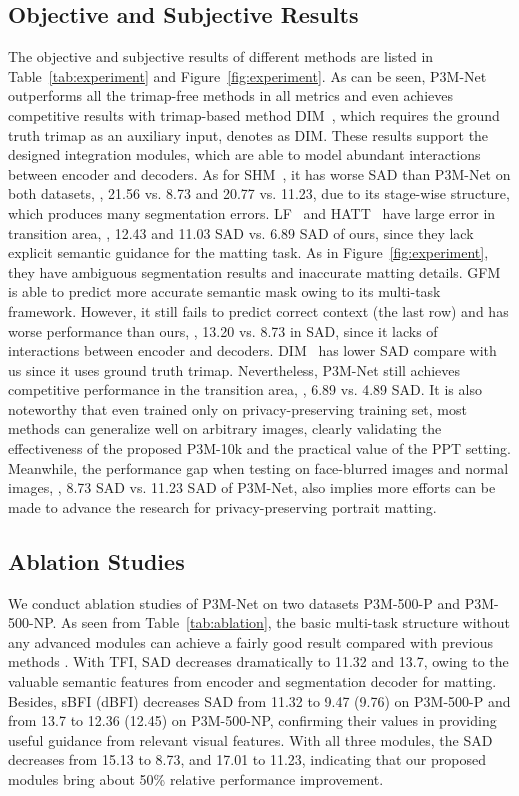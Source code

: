 \documentclass[sigconf]{acmart}
\begin{document}
\subsection{Objective and Subjective Results}
The objective and subjective results of different methods are listed in Table~\ref{tab:experiment} and Figure~\ref{fig:experiment}. As can be seen, P3M-Net outperforms all the trimap-free methods in all metrics and even achieves competitive results with trimap-based method DIM~\cite{dim}, which requires the ground truth trimap as an auxiliary input, denotes as DIM. These results support the designed integration modules, which are able to model abundant interactions between encoder and decoders. As for SHM~\cite{shm}, it has worse SAD than P3M-Net on both datasets, , 21.56 vs. 8.73 and 20.77 vs. 11.23, due to its stage-wise structure, which produces many segmentation errors. LF~\cite{lf} and HATT~\cite{hatt} have large error in transition area, , 12.43 and 11.03 SAD vs. 6.89 SAD of ours, since they lack explicit semantic guidance for the matting task. As in Figure~\ref{fig:experiment}, they have ambiguous segmentation results and inaccurate matting details. GFM~\cite{gfm} is able to predict more accurate semantic mask owing to its multi-task framework. However, it still fails to predict correct context (the last row) and has worse performance than ours, , 13.20 vs. 8.73 in SAD, since it lacks of interactions between encoder and decoders. DIM~\cite{dim} has lower SAD compare with us since it uses ground truth trimap. Nevertheless, P3M-Net still achieves competitive performance in the transition area, , 6.89 vs. 4.89 SAD. It is also noteworthy that even trained only on privacy-preserving training set, most methods can generalize well on arbitrary images, clearly validating the effectiveness of the proposed P3M-10k and the practical value of the PPT setting. Meanwhile, the performance gap when testing on face-blurred images and normal images, , 8.73 SAD vs. 11.23 SAD of P3M-Net, also implies more efforts can be made to advance the research for privacy-preserving portrait matting.

\subsection{Ablation Studies}
We conduct ablation studies of P3M-Net on two datasets P3M-500-P and P3M-500-NP. As seen from Table~\ref{tab:ablation}, the basic multi-task structure without any advanced modules can achieve a fairly good result compared with previous methods \cite{shm,hatt,lf}. With TFI, SAD decreases dramatically to 11.32 and 13.7, owing to the valuable semantic features from encoder and segmentation decoder for matting. Besides, sBFI (dBFI) decreases SAD from 11.32 to 9.47 (9.76) on P3M-500-P and from 13.7 to 12.36 (12.45) on P3M-500-NP, confirming their values in providing useful guidance from relevant visual features. With all three modules, the SAD decreases from 15.13 to 8.73, and 17.01 to 11.23, indicating that our proposed modules bring about 50\% relative performance improvement.
\end{document}
